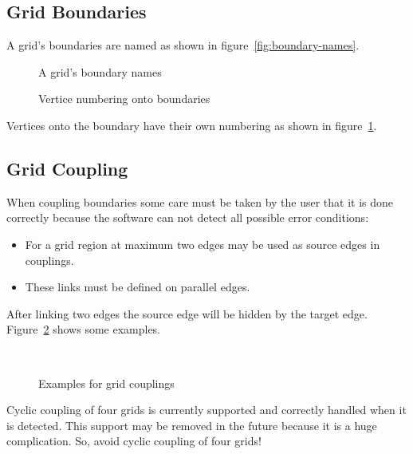 \subsection{Grid Boundaries}
\label{sec:grid-boundaries}

A grid's boundaries are named as shown in figure~\ref{fig:boundary-names}.
\begin{figure}
  \begin{minipage}{.485\linewidth}
    \centering
    \caption{A grid's boundary names}
    \label{fig:boundary-names}
  \end{minipage}
  \hfil
  \begin{minipage}{.485\linewidth}
    \centering
    \caption{Vertice numbering onto boundaries}
    \label{fig:Vertice-numbering-onto-boundaries}
  \end{minipage}
\end{figure}
Vertices onto the boundary have their own numbering as shown in
figure~\ref{fig:Vertice-numbering-onto-boundaries}.


\subsection{Grid Coupling}
\label{sec:grid-coupling}

When coupling boundaries some care must be taken by the user that it
is done correctly because the software can not detect all possible
error conditions:
\begin{itemize}
\item For a grid region at maximum two edges may be used as source
  edges in couplings.
\item These links must be defined on parallel edges.
\end{itemize}
After linking two edges the source edge will be hidden by the target
edge.  Figure~\ref{fig:GridCouplings} shows some examples.
\begin{figure}
  \centering
   \hfil
   \\[1.4\bigskipamount]
  \caption{Examples for grid couplings}
  \label{fig:GridCouplings}
\end{figure}
Cyclic coupling of four grids is currently supported and correctly
handled when it is detected.  This support may be removed in the
future because it is a huge complication. So, avoid cyclic coupling of
four grids!


